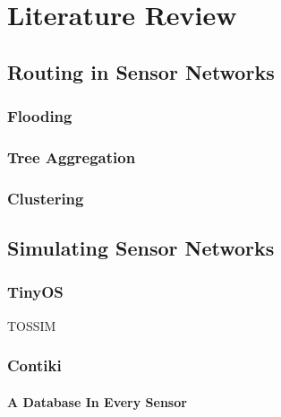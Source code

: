 \section{Literature Review}

\subsection{Routing in Sensor Networks}

\cite{TankBible}

\cite{aggphdfeng} %

\subsubsection*{Flooding}

\subsubsection*{Tree Aggregation}
\cite{1628365} %

\subsubsection*{Clustering}


\subsection{Simulating Sensor Networks}

\subsubsection*{TinyOS}

TOSSIM \cite{levis2003tossim}

\subsubsection*{Contiki}

\paragraph{A Database In Every Sensor} 
\cite{Tsiftes:2011:DS:2070942.2070974} %
\cite{TinyDB}

